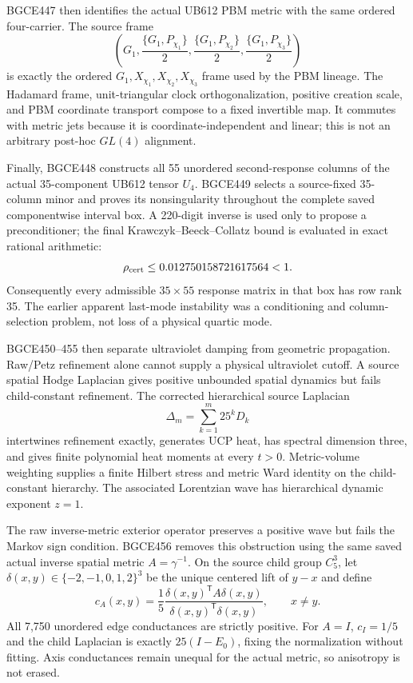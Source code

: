 \documentclass[11pt]{article}
\theoremstyle{definition}
\theoremstyle{remark}
\begin{document}
BGCE447 then identifies the actual UB612 PBM metric with the same ordered four-carrier. The source frame
\begin{equation}
 \left(G_1,\frac{\{G_1,P_{\chi_1}\}}2,
 \frac{\{G_1,P_{\chi_2}\}}2,
 \frac{\{G_1,P_{\chi_3}\}}2\right)
\end{equation}
is exactly the ordered $G_1,X_{\chi_1},X_{\chi_2},X_{\chi_3}$ frame used by the PBM lineage. The Hadamard frame, unit-triangular clock orthogonalization, positive creation scale, and PBM coordinate transport compose to a fixed invertible map. It commutes with metric jets because it is coordinate-independent and linear; this is not an arbitrary post-hoc $GL(4)$ alignment.

Finally, BGCE448 constructs all 55 unordered second-response columns of the actual 35-component UB612 tensor $U_4$. BGCE449 selects a source-fixed 35-column minor and proves its nonsingularity throughout the complete saved componentwise interval box. A 220-digit inverse is used only to propose a preconditioner; the final Krawczyk--Beeck--Collatz bound is evaluated in exact rational arithmetic:
\begin{equation}
 \rho_{\rm cert}\le 0.012750158721617564<1.
\end{equation}
Consequently every admissible $35\times55$ response matrix in that box has row rank 35. The earlier apparent last-mode instability was a conditioning and column-selection problem, not loss of a physical quartic mode.

BGCE450--455 then separate ultraviolet damping from geometric propagation. Raw/Petz refinement alone cannot supply a physical ultraviolet cutoff. A source spatial Hodge Laplacian gives positive unbounded spatial dynamics but fails child-constant refinement. The corrected hierarchical source Laplacian
\begin{equation}
 \Delta_m=\sum_{k=1}^{m}25^kD_k
\end{equation}
intertwines refinement exactly, generates UCP heat, has spectral dimension three, and gives finite polynomial heat moments at every $t>0$. Metric-volume weighting supplies a finite Hilbert stress and metric Ward identity on the child-constant hierarchy. The associated Lorentzian wave has hierarchical dynamic exponent $z=1$.

The raw inverse-metric exterior operator preserves a positive wave but fails the Markov sign condition. BGCE456 removes this obstruction using the same saved actual inverse spatial metric $A=\gamma^{-1}$. On the source child group $C_5^3$, let $\delta(x,y)\in\{-2,-1,0,1,2\}^3$ be the unique centered lift of $y-x$ and define
\begin{equation}\label{eq:conductance09}
 c_A(x,y)=\frac15\frac{\delta(x,y)^{\mathsf T}A\delta(x,y)}
 {\delta(x,y)^{\mathsf T}\delta(x,y)},
 \qquad x\ne y.
\end{equation}
All 7,750 unordered edge conductances are strictly positive. For $A=I$, $c_I=1/5$ and the child Laplacian is exactly $25(I-E_0)$, fixing the normalization without fitting. Axis conductances remain unequal for the actual metric, so anisotropy is not erased.
\end{document}
